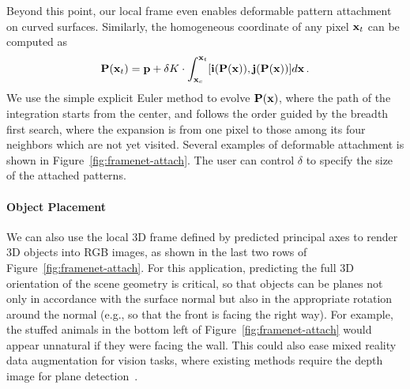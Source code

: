 Beyond this point, our local frame even enables deformable pattern attachment on curved surfaces. Similarly, the homogeneous coordinate of any pixel $\mathbf{x}_t$ can be computed as
\begin{equation}
    \mathbf{P}(\mathbf{x}_t)=\mathbf{p} + \delta K \cdot\int_{\mathbf{x}_c}^{\mathbf{x}_t} [\textbf{i}(\mathbf{P}(\mathbf{x})),\textbf{j}(\mathbf{P}(\mathbf{x}))] d\mathbf{x}\,.
\end{equation}
We use the simple explicit Euler method to evolve $\mathbf{P}(\mathbf{x})$, where the path of the integration starts from the center, and follows the order guided by the breadth first search, where the expansion is from one pixel to those among its four neighbors which are not yet visited. Several examples of deformable attachment is shown in Figure~\ref{fig:framenet-attach}. The user can control $\delta$ to specify the size of the attached patterns.

\vspace{-0.1in}
\paragraph{Object Placement} We can also use the local 3D frame defined by predicted principal axes to render 3D objects into RGB images, as shown in the last two rows of Figure~\ref{fig:framenet-attach}.  For this application, predicting the full 3D orientation of the scene geometry is critical, so that objects can be planes not only in accordance with the surface normal but also in the appropriate rotation around the normal (e.g., so that the front is facing the right way).   For example, the stuffed animals in the bottom left of Figure~\ref{fig:framenet-attach} would appear unnatural if they were facing the wall. This could also ease mixed reality data augmentation for vision tasks, where existing methods require the depth image for plane detection~\cite{wang2019normalized}.

